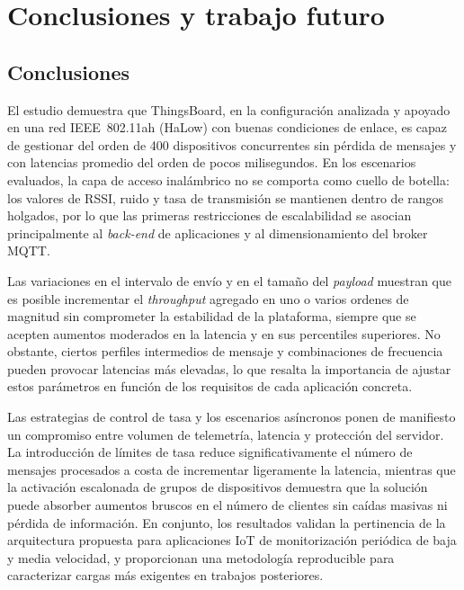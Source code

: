 \section{Conclusiones y trabajo futuro}
\subsection{Conclusiones}
El estudio demuestra que ThingsBoard, en la configuraci\'on analizada y apoyado en una red IEEE~802.11ah (HaLow) con buenas condiciones de enlace, es capaz de gestionar del orden de \num{400} dispositivos concurrentes sin p\'erdida de mensajes y con latencias promedio del orden de pocos milisegundos. En los escenarios evaluados, la capa de acceso inal\'ambrico no se comporta como cuello de botella: los valores de RSSI, ruido y tasa de transmisi\'on se mantienen dentro de rangos holgados, por lo que las primeras restricciones de escalabilidad se asocian principalmente al \emph{back-end} de aplicaciones y al dimensionamiento del broker MQTT.

Las variaciones en el intervalo de env\'io y en el tama\~no del \emph{payload} muestran que es posible incrementar el \emph{throughput} agregado en uno o varios ordenes de magnitud sin comprometer la estabilidad de la plataforma, siempre que se acepten aumentos moderados en la latencia y en sus percentiles superiores. No obstante, ciertos perfiles intermedios de mensaje y combinaciones de frecuencia pueden provocar latencias m\'as elevadas, lo que resalta la importancia de ajustar estos par\'ametros en funci\'on de los requisitos de cada aplicaci\'on concreta.

Las estrategias de control de tasa y los escenarios as\'incronos ponen de manifiesto un compromiso entre volumen de telemetr\'ia, latencia y protecci\'on del servidor. La introducci\'on de l\'imites de tasa reduce significativamente el n\'umero de mensajes procesados a costa de incrementar ligeramente la latencia, mientras que la activaci\'on escalonada de grupos de dispositivos demuestra que la soluci\'on puede absorber aumentos bruscos en el n\'umero de clientes sin ca\'idas masivas ni p\'erdida de informaci\'on. En conjunto, los resultados validan la pertinencia de la arquitectura propuesta para aplicaciones IoT de monitorizaci\'on peri\'odica de baja y media velocidad, y proporcionan una metodolog\'ia reproducible para caracterizar cargas m\'as exigentes en trabajos posteriores.

